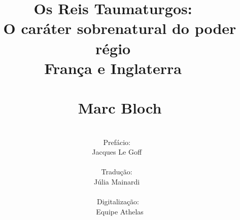\documentclass[a5paper]{book}
\begin{document}
\frontmatter
\title{Os Reis Taumaturgos: ~\\O caráter sobrenatural do poder régio ~\\França e Inglaterra ~\\ ~\\Marc Bloch}
\author{~\\Prefácio: ~\\ Jacques Le Goff ~\\ ~\\ Tradução: ~\\ Júlia Mainardi ~\\ ~\\Digitalização:~\\Equipe Athelas}
\date{}
\maketitle
\end{document}
